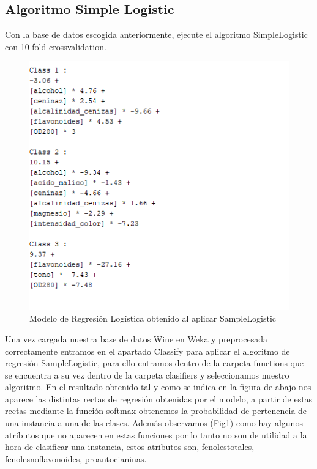 \subsection{Algoritmo Simple Logistic}
Con la base de datos escogida anteriormente, ejecute el algoritmo SimpleLogistic con 10-fold crossvalidation. 


\begin{figure}[H]
    \centering
    \includegraphics[width=\textwidth]{img/SL.PNG}
    \caption{Modelo de Regresión Logística obtenido al aplicar SampleLogistic}
    \label{fig:Modeloregresion}
\end{figure}
    
Una vez cargada nuestra base de datos Wine en Weka y preprocesada correctamente entramos en el apartado Classify para aplicar el algoritmo de regresión SampleLogistic, para ello entramos dentro de la carpeta functions que se encuentra a su vez dentro de la carpeta clasifiers y seleccionamos nuestro algoritmo.
En el resultado obtenido tal y como se indica en la figura de abajo nos aparece las distintas rectas de regresión obtenidas por el modelo, a partir de estas rectas mediante la función softmax obtenemos la probabilidad de pertenencia de una instancia a una de las clases. Además observamos (Fig\ref{fig:Modeloregresion}) como hay algunos atributos que no aparecen en estas funciones por lo tanto no son de utilidad a la hora de clasificar una instancia, estos atributos son, fenolestotales, fenolesnoflavonoides, proantocianinas.


